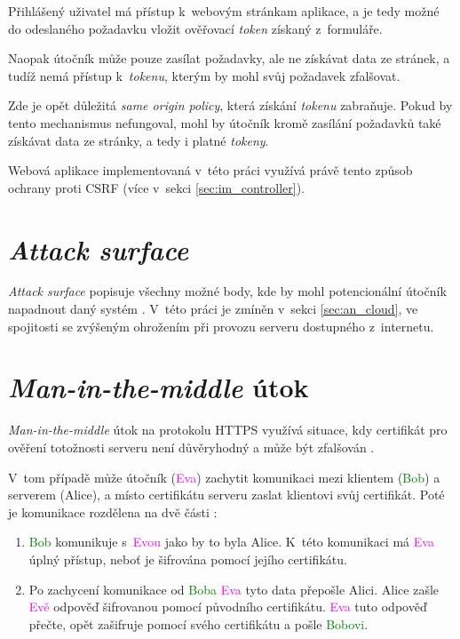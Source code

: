 Přihlášený uživatel má přístup k~webovým stránkam aplikace, a je tedy možné do odeslaného požadavku vložit ověřovací \textit{token} získaný z~formuláře. 

Naopak útočník může pouze zasílat požadavky, ale ne získávat data ze stránek, a tudíž nemá přístup k~\textit{tokenu}, kterým by mohl svůj požadavek zfalšovat.

Zde je opět důležitá \textit{same origin policy}, která získání \textit{tokenu} zabraňuje. Pokud by tento mechanismus nefungoval, mohl by útočník kromě zasílání požadavků také získávat data ze stránky, a tedy i platné \textit{tokeny}.

Webová aplikace implementovaná v~této práci využívá právě tento způsob ochrany proti CSRF (více v~sekci \ref{sec:im_controller}).

\section{\textit{Attack surface}}

\textit{Attack surface} popisuje všechny možné body, kde by mohl potencionální útočník napadnout daný systém \cite{attack_surface_owasp}. V~této práci je zmíněn v~sekci \ref{sec:an_cloud}, ve spojitosti se zvýšeným ohrožením při provozu serveru dostupného z~internetu.

\section{\textit{Man-in-the-middle} útok}

\textit{Man-in-the-middle} útok na protokolu HTTPS využívá situace, kdy certifikát pro ověření totožnosti serveru není důvěryhodný a může být zfalšován \cite{mitm}. 

V~tom případě může útočník (\textcolor{magenta}{Eva}) zachytit komunikaci mezi klientem (\textcolor{green}{Bob}) a serverem (\textcolor{blue2}{Alice}), a místo certifikátu serveru zaslat klientovi svůj certifikát. Poté je komunikace rozdělena na dvě části \cite{mitm}:

\begin{enumerate}
    \item \textcolor{green}{Bob} komunikuje s~\textcolor{magenta}{Evou} jako by to byla \textcolor{blue2}{Alice}. K~této komunikaci má \textcolor{magenta}{Eva} úplný přístup, neboť je šifrována pomocí jejího certifikátu.
    \item Po zachycení komunikace od \textcolor{green}{Boba} \textcolor{magenta}{Eva} tyto data přepošle \textcolor{blue2}{Alici}. \textcolor{blue2}{Alice} zašle \textcolor{magenta}{Evě} odpověď šifrovanou pomocí původního certifikátu. \textcolor{magenta}{Eva} tuto odpověď přečte, opět zašifruje pomocí svého certifikátu a pošle \textcolor{green}{Bobovi}.
\end{enumerate}


